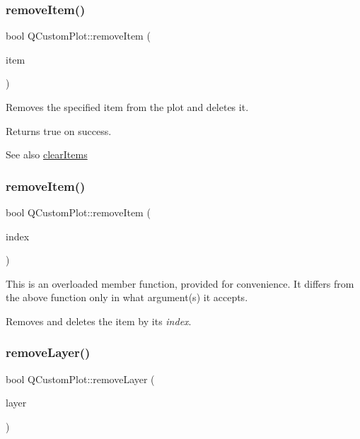 \subsubsection{\texorpdfstring{remove\+Item()}{removeItem()}\hspace{0.1cm}{\footnotesize\ttfamily [1/2]}}
{\footnotesize\ttfamily bool Q\+Custom\+Plot\+::remove\+Item (\begin{DoxyParamCaption}\item[{\hyperlink{class_q_c_p_abstract_item}{Q\+C\+P\+Abstract\+Item} $\ast$}]{item }\end{DoxyParamCaption})}

Removes the specified item from the plot and deletes it.

Returns true on success.

\begin{DoxySeeAlso}{See also}
\hyperlink{class_q_custom_plot_abdfd07d4f0591d0cf967f85013fd3645}{clear\+Items} 
\end{DoxySeeAlso}
\mbox{\label{class_q_custom_plot_abcfdda3d601c0441cab136137d715dea}} 
\subsubsection{\texorpdfstring{remove\+Item()}{removeItem()}\hspace{0.1cm}{\footnotesize\ttfamily [2/2]}}
{\footnotesize\ttfamily bool Q\+Custom\+Plot\+::remove\+Item (\begin{DoxyParamCaption}\item[{int}]{index }\end{DoxyParamCaption})}

This is an overloaded member function, provided for convenience. It differs from the above function only in what argument(s) it accepts.

Removes and deletes the item by its {\itshape index}. \mbox{\label{class_q_custom_plot_a40f75e342c5eaab6a86066a42a0e2a94}} 
\subsubsection{\texorpdfstring{remove\+Layer()}{removeLayer()}}
{\footnotesize\ttfamily bool Q\+Custom\+Plot\+::remove\+Layer (\begin{DoxyParamCaption}\item[{\hyperlink{class_q_c_p_layer}{Q\+C\+P\+Layer} $\ast$}]{layer }\end{DoxyParamCaption})}

